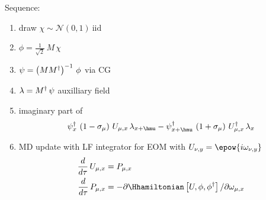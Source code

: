 Sequence:
\begin{enumerate}
  \item draw $\chi \sim \mathcal{N}\left( 0,1 \right) \mathrm{~iid}$
  \item $\phi = \frac{1}{\sqrt{2}}\,M\,\chi$
  \item $\psi = \left( MM^{\dagger} \right)^{-1}\,\phi$ via CG
  \item $\lambda = M^{\dagger}\,\psi$ auxilliary field
  \item imaginary part of
    \begin{align*}
    \psi_x^{\dagger}\,\left( 1-\sigma_\mu \right)\,U_{\mu,x}\,\lambda_{x+\hmu}
    - \psi_{x+\hmu}^{\dagger}\,\left( 1+\sigma_\mu \right)\,U_{\mu,x}^{\dagger}\,\lambda_{x}
    \end{align*}
  \item MD update with LF integrator for EOM with $U_{\nu,y} = \epow{i\omega_{\nu,y} }$
    \begin{align}
      \frac{d}{d\tau} \,U_{\mu,x} &= P_{\mu,x}
      \label{eq:eom-1} \\
      \frac{d}{d\tau} \,P_{\mu,x} &= -\partial \Hhamiltonian\left[ U,\phi,\phidag \right] / \partial \omega_{\mu,x} 
      \label{eq:eom-2}
    \end{align}
\end{enumerate}
